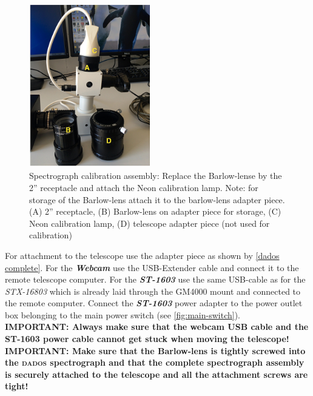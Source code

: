 \documentclass[a4paper, 11pt, fleqn]{memoir}
\begin{document}
\begin{figure}[t!]
    \centering
    \includegraphics[width=0.47\textwidth]{dados-assembly-calib}
    \caption{Spectrograph calibration assembly:  \newline Replace the Barlow-lense by the 2'' receptacle and attach the Neon calibration lamp.
        Note: for storage of the Barlow-lens attach it to the barlow-lens adapter piece.
        \newline (A) 2'' receptacle, (B) Barlow-lens on adapter piece for storage, (C) Neon calibration lamp, \newline  (D) telescope adapter piece (not used for calibration) }
    \label{dados calib}
\end{figure}

For attachment to the telescope use the adapter piece as shown by \cref{dados complete}.
For the \textbf{\textit{Webcam}} use the USB-Extender cable and connect it to the remote telescope computer.
For the \textbf{\textit{ST-1603}} use the same USB-cable as for the \textit{STX-16803} which is already laid through the GM4000 mount and connected to the remote computer.
Connect the \textbf{\textit{ST-1603}} power adapter to the power outlet box belonging to the main power switch (see \cref{fig:main-switch}).
\\

\textbf{IMPORTANT: Always make sure that the webcam USB cable and the ST-1603 power cable cannot get stuck when moving the telescope!}\\

\textbf{IMPORTANT: Make sure that the Barlow-lens is tightly screwed into the \textsc{dados} spectrograph and that the complete spectrograph assembly is
    securely attached to the telescope and all the attachment screws are tight!}\\
\end{document}
